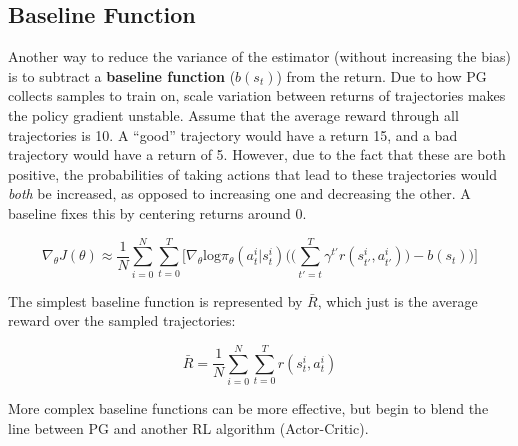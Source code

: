 \subsection{Baseline Function}
\begin{flushleft}
    \large Another way to reduce the variance of the estimator (without increasing the bias) is to subtract a \textbf{baseline function} ($b(s_t)$) from the return. Due to how PG collects samples to train on, scale variation between returns of trajectories makes the policy gradient unstable. Assume that the average reward through all trajectories is 10. A ``good'' trajectory would have a return 15, and a bad trajectory would have a return of 5. However, due to the fact that these are both positive, the probabilities of taking actions that lead to these trajectories would \textit{both} be increased, as opposed to increasing one and decreasing the other. A baseline fixes this by centering returns around 0.

    $$\nabla_\theta J(\theta) \approx \frac{1}{N}\sum_{i=0}^N\sum_{t=0}^T\biggl[ \nabla_\theta \mathrm{log}\pi_\theta(a_t^i|s_t^i)\biggl(\biggl(\sum_{t'=t}^T \gamma^{t'} r(s_{t'}^i, a_{t'}^i)\biggl) - b(s_t)\biggr)\biggr]$$

    The simplest baseline function is represented by $\bar{R}$, which just is the average reward over the sampled trajectories:

    $$\bar{R} = \frac{1}{N}\sum_{i=0}^N \sum_{t=0}^T r(s_t^i,a_t^i)$$

    More complex baseline functions can be more effective, but begin to blend the line between PG and another RL algorithm (Actor-Critic). \break
\end{flushleft}

